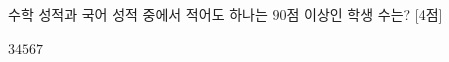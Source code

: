 수학 성적과 국어 성적 중에서 적어도 하나는 $90$점 이상인 학생 수는? \mbox{[4점]}
\begin{choices32}{$3$}{$4$}{$5$}{$6$}{$7$}\end{choices32}
